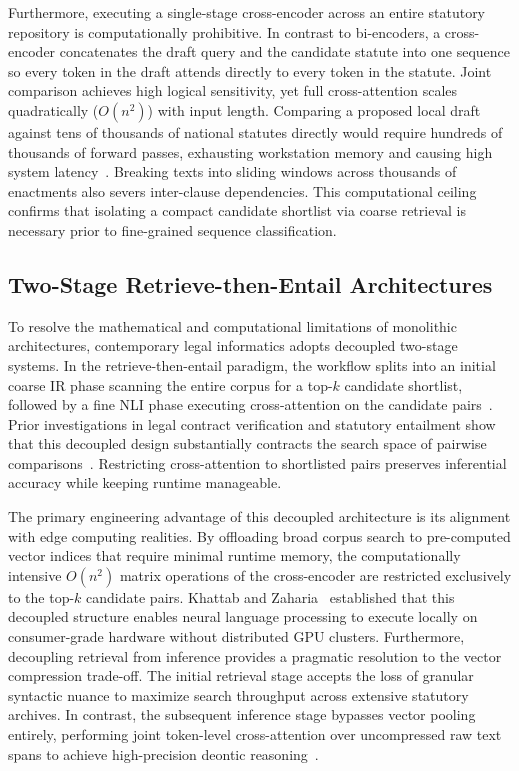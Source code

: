     Furthermore, executing a single-stage cross-encoder across an entire statutory repository is computationally prohibitive. In contrast to bi-encoders, a cross-encoder concatenates the draft query and the candidate statute into one sequence so every token in the draft attends directly to every token in the statute. Joint comparison achieves high logical sensitivity, yet full cross-attention scales quadratically ($O(n^2)$) with input length. Comparing a proposed local draft against tens of thousands of national statutes directly would require hundreds of thousands of forward passes, exhausting workstation memory and causing high system latency~\cite{beltagy2020longformer}. Breaking texts into sliding windows across thousands of enactments also severs inter-clause dependencies. This computational ceiling confirms that isolating a compact candidate shortlist via coarse retrieval is necessary prior to fine-grained sequence classification.

    \subsection{Two-Stage Retrieve-then-Entail Architectures}
    To resolve the mathematical and computational limitations of monolithic architectures, contemporary legal informatics adopts decoupled two-stage systems. In the retrieve-then-entail paradigm, the workflow splits into an initial coarse IR phase scanning the entire corpus for a top-$k$ candidate shortlist, followed by a fine NLI phase executing cross-attention on the candidate pairs~\cite{koreeda2021contract, goebel2026an}. Prior investigations in legal contract verification and statutory entailment show that this decoupled design substantially contracts the search space of pairwise comparisons~\cite{koreeda2021contract}. Restricting cross-attention to shortlisted pairs preserves inferential accuracy while keeping runtime manageable.

    The primary engineering advantage of this decoupled architecture is its alignment with edge computing realities. By offloading broad corpus search to pre-computed vector indices that require minimal runtime memory, the computationally intensive $O(n^2)$ matrix operations of the cross-encoder are restricted exclusively to the top-$k$ candidate pairs. Khattab and Zaharia~\cite{khattab2020colbert} established that this decoupled structure enables neural language processing to execute locally on consumer-grade hardware without distributed GPU clusters. Furthermore, decoupling retrieval from inference provides a pragmatic resolution to the vector compression trade-off. The initial retrieval stage accepts the loss of granular syntactic nuance to maximize search throughput across extensive statutory archives. In contrast, the subsequent inference stage bypasses vector pooling entirely, performing joint token-level cross-attention over uncompressed raw text spans to achieve high-precision deontic reasoning~\cite{humeau2019poly}.

